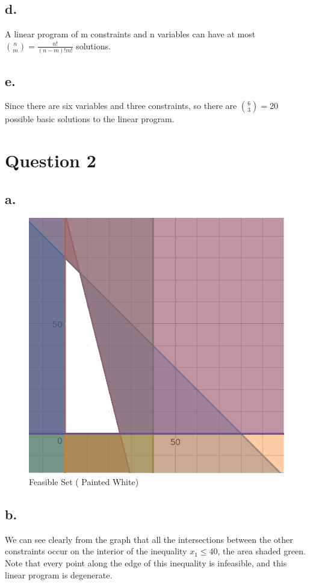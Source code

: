 \documentclass[10pt, letterpaper]{paper}
\begin{document}
\subsection*{d.}
A linear program of m constraints and n variables can have at most ${n \choose m} = \frac{n!}{(n-m)! m!}$ solutions.

\subsection*{e.}
Since there are six variables and three constraints, so there are ${ 6 \choose 3 } = 20$ possible basic solutions to the linear program.

\section*{ Question 2 }

\subsection*{a.} 
\begin{figure}[H]
\centering\includegraphics[height=1\textwidth]{graph1.png}
\caption{Feasible Set ( Painted White) }
\end{figure}

\subsection*{b. }
We can  see clearly from the graph that all the intersections between the other constraints occur on the interior of the inequality $x_1 \leq 40$, the area shaded green.
Note that every point along the edge of this inequality is infeasible, and this linear program is degenerate.
\end{document}
